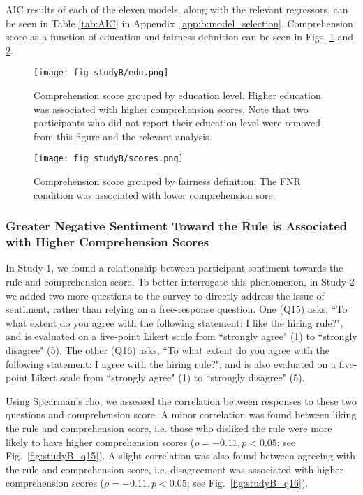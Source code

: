 \documentclass{article}
\newcommand{\studyA}{Study-1}
\newcommand{\studyB}{Study-2}
\newcommand{\Appref}[1]{Appendix~\ref{#1}}
\begin{document}
AIC results of each of the eleven models, along with the relevant regressors, can be seen in Table \ref{tab:AIC} in \Appref{app:b:model_selection}. Comprehension score as a function of education and fairness definition can be seen in Figs. \ref{fig:studyB_edu} and \ref{fig:studyB_scores}.


\begin{figure}[th]
    \centering
    \texttt{[image: fig\_studyB/edu.png]}
    \vspace{-15pt}
    \caption{Comprehension score grouped by education level. Higher education was associated with higher comprehension scores. Note that two participants who did not report their education level were removed from this figure and the relevant analysis.}
    \label{fig:studyB_edu}
    \vspace{-5pt}
\end{figure}

\begin{figure}[th]
    \centering
    \texttt{[image: fig\_studyB/scores.png]}
    \vspace{-15pt}
    \caption{Comprehension score grouped by fairness definition. The FNR condition was associated with lower comprehension sore.}
    \label{fig:studyB_scores}
    \vspace{-10pt}
\end{figure}


\subsubsection{Greater Negative Sentiment Toward the Rule is Associated with Higher Comprehension Scores} \label{results:b:sentiment}

In \studyA{}, we found a relationship between participant sentiment towards the rule and comprehension score. To better interrogate this phenomenon, in \studyB{} we added two more questions to the survey to directly address the issue of sentiment, rather than relying on a free-response question. One (Q15) asks, ``To what extent do you agree with the following statement: I like the hiring rule?", and is evaluated on a five-point Likert scale from ``strongly agree" (1) to ``strongly disagree" (5). The other (Q16) asks, ``To what extent do you agree with the following statement: I agree with the hiring rule?", and is also evaluated on a five-point Likert scale from ``strongly agree" (1) to ``strongly disagree" (5).

Using Spearman's rho, we assessed the correlation between responses to these two questions and comprehension score. A minor correlation was found between liking the rule and comprehension score, i.e. those who disliked the rule were more likely to have higher comprehension scores ($\rho = -0.11, p < 0.05$; see Fig.~\ref{fig:studyB_q15}).
A slight correlation was also found between agreeing with the rule and comprehension score, i.e. disagreement was associated with higher comprehension scores ($\rho = -0.11, p < 0.05$; see Fig.~\ref{fig:studyB_q16}).
\end{document}
